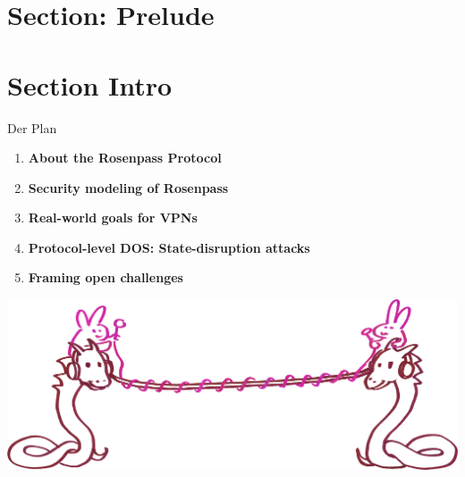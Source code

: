 \section{Section: Prelude}

\section{Section Intro}

\begin{frame}[c]{Der Plan}
  \centering
  \small

  \begin{enumerate}
    \item \textbf{About the Rosenpass Protocol}
    \item \textbf{Security modeling of Rosenpass}
    \item \textbf{Real-world goals for VPNs}
    \item \textbf{Protocol-level DOS: State-disruption attacks}
    \item \textbf{Framing open challenges}
  \end{enumerate}

  \includegraphics[height=.4\textheight]{graphics/wireguard-and-rp-bunny-rose.png}
\end{frame}

